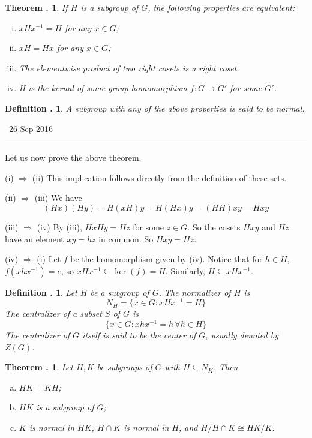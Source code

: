 \documentclass[twoside]{report}
\newcounter{Lecture}
\newcommand{\newLec}[1]{
  \stepcounter{Lecture}
  \noindent{\Large\bf Lecture \arabic{Lecture}} \, #1 \hfill  \rule[1ex]{2.5in}{.1pt} \vspace{1em}
}
\theoremstyle{myts}
\newcounter{c}[Lecture]
\newtheorem{dfn}[c]{Definition \arabic{Lecture}.}
\newtheorem{thm}[c]{Theorem \arabic{Lecture}.}
\newcounter{ex}[Lecture]
\newenvironment{prf}{
  \noindent\begin{mdframed}[style=prf]}{\end{mdframed} \vspace{1em}
}
\begin{document}
\begin{thm}
  If $H$ is a subgroup of $G$, the following properties are equivalent:
  \begin{enumerate} [(i)]
    \item $xHx^{-1} = H$ for any $x\in G$;
    \item $xH=Hx$ for any $x\in G$;
    \item The elementwise product of two right cosets is a right coset.
    \item H is the kernal of some group homomorphism $f:G\to G'$ for some $G'$.
  \end{enumerate}
\end{thm}

\begin{dfn}
  A subgroup with any of the above properties is said to be \emph{normal}.
\end{dfn}

\newLec{26 Sep 2016}

\noindent Let us now prove the above theorem.

\begin{prf}
  (i) $\Rightarrow$ (ii) This implication follows directly from the definition of these sets.

  \noindent
  (ii) $\Rightarrow$ (iii) We have
    \[
      (Hx)(Hy) = H(xH)y=H(Hx)y=(HH)xy=Hxy
    \]

  \noindent
  (iii) $\Rightarrow$ (iv) By (iii), $HxHy = Hz$ for some $z\in G$. So the cosets $Hxy$ and $Hz$ have an element $xy = hz$ in common. So $Hxy=Hz$.

  \noindent
  (iv) $\Rightarrow$ (i) Let $f$ be the homomorphism given by (iv). Notice that for $h\in H$, $f(xhx^{-1})=e$, so $xHx^{-1}\subseteq \ker(f) = H$. Similarly, $H\subseteq xHx^{-1}$.
\end{prf}

\begin{dfn}
  Let $H$ be a subgroup of $G$. The \emph{normalizer} of $H$ is
  \[
    N_H = \{ x\in G : xHx^{-1} = H \}
  \]
  The \emph{centralizer} of a subset $S$ of $G$ is
  \[
    \{ x\in G : xhx^{-1} = h\, \forall h\in H \}
  \]
  The centralizer of $G$ itself is said to be the \emph{center} of $G$, usually denoted by $Z(G)$.
\end{dfn}

\begin{thm}
  Let $H,K$ be subgroups of $G$ with $H\subseteq N_K$. Then
  \begin{enumerate}[(a)]
    \item $HK=KH$;
    \item $HK$ is a subgroup of $G$;
    \item $K$ is normal in $HK$, $H\cap K$ is normal in $H$, and $H/H\cap K \cong HK/K$.
  \end{enumerate}
\end{thm}
\end{document}
